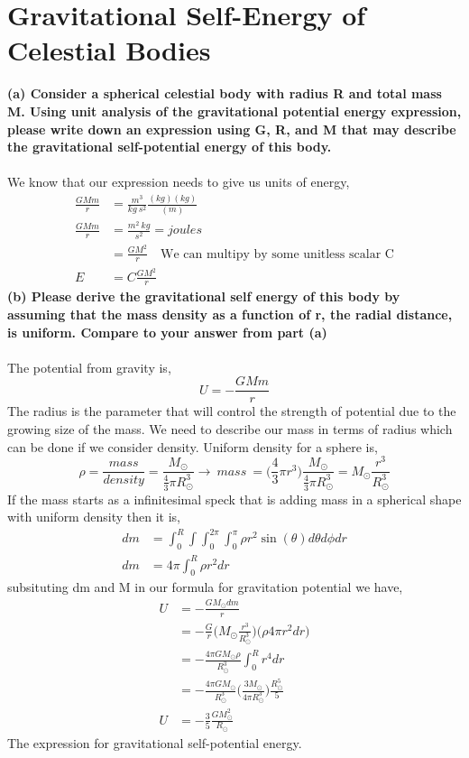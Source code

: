 \documentclass[paper=a4, fontsize=11pt]{scrartcl} %
\numberwithin{equation}{section} %
\numberwithin{figure}{section} %
\numberwithin{table}{section} %
\begin{document}
\section{Gravitational Self-Energy of Celestial Bodies}
\textbf{(a) Consider a spherical celestial body with radius R and total mass M. Using unit
analysis of the gravitational potential energy expression, please write down an expression
using G, R, and M that may describe the gravitational self-potential energy of this body.}\\
\\
We know that our expression needs to give us units of energy,
\begin{align*}
\frac{GMm}{r} & = \frac{m^3}{kg\ s^2}\frac{  (kg)(kg)}{(m)} \\
\frac{GMm}{r} & = \frac{m^2\ kg}{s^2} = joules \\
& = \frac{GM^2}{r}\quad \text{We can multipy by some unitless scalar C} \\
E & = C\frac{GM^2}{r}
\end{align*}
\textbf{(b) Please derive the gravitational self energy of this body by assuming that the mass
density as a function of r, the radial distance, is uniform. Compare to your answer from
part (a)}\\
\\
The potential from gravity is,
\begin{equation*}
U = - \frac{GMm}{r}
\end{equation*}
The radius is the parameter that will control the strength of potential due to the growing size of the mass. We need to describe our mass in terms of radius which can be done if we consider density.
Uniform density for a sphere is,
\begin{equation*}
\rho = \frac{mass}{density} = \frac{M_{\odot}}{\tfrac{4}{3} \pi R_{\odot}^3} \rightarrow\  mass\ = \bigg ( \frac{4}{3} \pi r^3 \bigg)\frac{M_{\odot}}{\tfrac{4}{3} \pi R_{\odot}^3} = M_{\odot}\frac{r^3}{R_{\odot}^3}
\end{equation*}
If the mass starts as a infinitesimal speck that is adding mass in a spherical shape with uniform density then it is,
\begin{align*}
dm &= \int_0^R \int \int_0^{2\pi} \int_0^\pi  \rho r^2 \sin(\theta) d\theta d\phi dr\\
dm &= 4\pi \int_0^R \rho r^2 dr 
\end{align*}
subsituting dm and M in our formula for gravitation potential we have,
\begin{align*}
U & = - \frac{GM_{\odot}dm}{r} \\
& = - \frac{G}{r} \bigg ( M_{\odot}\tfrac{r^3}{R_{\odot}^3} \bigg) \bigg( \rho 4\pi r^2 dr \bigg)\\
& = - \frac{4\pi GM_{\odot} \rho}{R_{\odot}^3} \int_0^R r^4 dr \\
& =  - \frac{4\pi GM_{\odot} }{R_{\odot}^3} \bigg( \frac{3M_{\odot}}{4\pi R_{\odot}^3} \bigg ) \frac{R_{\odot}^5}{5}\\ 
U & = - \frac{3}{5} \frac{G M_{\odot}^2}{R_{\odot}}
\end{align*} 
The expression for gravitational self-potential energy.
\end{document}
